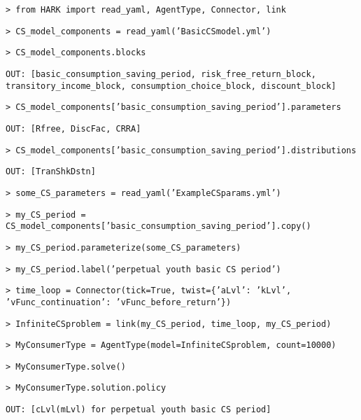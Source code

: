 \documentclass[12pt,pdftex,letterpaper]{article}
\begin{document}
\texttt{> from HARK import read\_yaml, AgentType, Connector, link}

\texttt{> CS\_model\_components = read\_yaml('BasicCSmodel.yml')}

\texttt{> CS\_model\_components.blocks}

\texttt{OUT: [basic\_consumption\_saving\_period, risk\_free\_return\_block, transitory\_income\_block, consumption\_choice\_block, discount\_block]}

\texttt{> CS\_model\_components['basic\_consumption\_saving\_period'].parameters}

\texttt{OUT: [Rfree, DiscFac, CRRA]}

\texttt{> CS\_model\_components['basic\_consumption\_saving\_period'].distributions}

\texttt{OUT: [TranShkDstn]}

\texttt{> some\_CS\_parameters = read\_yaml('ExampleCSparams.yml')}

\texttt{> my\_CS\_period = CS\_model\_components['basic\_consumption\_saving\_period'].copy()}

\texttt{> my\_CS\_period.parameterize(some\_CS\_parameters)}

\texttt{> my\_CS\_period.label('perpetual youth basic CS period')}

\texttt{> time\_loop = Connector(tick=True, twist=\{'aLvl': 'kLvl', 'vFunc\_continuation': 'vFunc\_before\_return'\})}

\texttt{> InfiniteCSproblem = link(my\_CS\_period, time\_loop, my\_CS\_period)}

\texttt{> MyConsumerType = AgentType(model=InfiniteCSproblem, count=10000)}

\texttt{> MyConsumerType.solve()}

\texttt{> MyConsumerType.solution.policy}

\texttt{OUT: [cLvl(mLvl) for perpetual youth basic CS period]}
\end{document}
